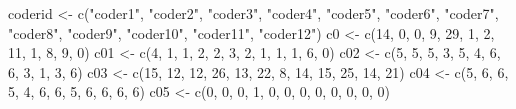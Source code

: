 \documentclass[
]{book}
\newenvironment{Shaded}{\begin{snugshade}}{\end{snugshade}}
\newcommand{\DecValTok}[1]{\textcolor[rgb]{0.00,0.00,0.81}{#1}}
\newcommand{\FunctionTok}[1]{\textcolor[rgb]{0.00,0.00,0.00}{#1}}
\newcommand{\NormalTok}[1]{#1}
\newcommand{\OtherTok}[1]{\textcolor[rgb]{0.56,0.35,0.01}{#1}}
\newcommand{\StringTok}[1]{\textcolor[rgb]{0.31,0.60,0.02}{#1}}
\begin{document}
\begin{Shaded}
\begin{Highlighting}[]
\NormalTok{coderid }\OtherTok{\textless{}{-}} \FunctionTok{c}\NormalTok{(}\StringTok{"coder1"}\NormalTok{, }\StringTok{"coder2"}\NormalTok{, }\StringTok{"coder3"}\NormalTok{, }\StringTok{"coder4"}\NormalTok{, }\StringTok{"coder5"}\NormalTok{, }
    \StringTok{"coder6"}\NormalTok{, }\StringTok{"coder7"}\NormalTok{, }\StringTok{"coder8"}\NormalTok{, }\StringTok{"coder9"}\NormalTok{, }\StringTok{"coder10"}\NormalTok{, }\StringTok{"coder11"}\NormalTok{, }
    \StringTok{"coder12"}\NormalTok{)}
\NormalTok{c0 }\OtherTok{\textless{}{-}} \FunctionTok{c}\NormalTok{(}\DecValTok{14}\NormalTok{, }\DecValTok{0}\NormalTok{, }\DecValTok{0}\NormalTok{, }\DecValTok{9}\NormalTok{, }\DecValTok{29}\NormalTok{, }\DecValTok{1}\NormalTok{, }\DecValTok{2}\NormalTok{, }\DecValTok{11}\NormalTok{, }\DecValTok{1}\NormalTok{, }\DecValTok{8}\NormalTok{, }\DecValTok{9}\NormalTok{, }\DecValTok{0}\NormalTok{)}
\NormalTok{c01 }\OtherTok{\textless{}{-}} \FunctionTok{c}\NormalTok{(}\DecValTok{4}\NormalTok{, }\DecValTok{1}\NormalTok{, }\DecValTok{1}\NormalTok{, }\DecValTok{2}\NormalTok{, }\DecValTok{2}\NormalTok{, }\DecValTok{3}\NormalTok{, }\DecValTok{2}\NormalTok{, }\DecValTok{1}\NormalTok{, }\DecValTok{1}\NormalTok{, }\DecValTok{1}\NormalTok{, }\DecValTok{6}\NormalTok{, }\DecValTok{0}\NormalTok{)}
\NormalTok{c02 }\OtherTok{\textless{}{-}} \FunctionTok{c}\NormalTok{(}\DecValTok{5}\NormalTok{, }\DecValTok{5}\NormalTok{, }\DecValTok{5}\NormalTok{, }\DecValTok{3}\NormalTok{, }\DecValTok{5}\NormalTok{, }\DecValTok{4}\NormalTok{, }\DecValTok{6}\NormalTok{, }\DecValTok{6}\NormalTok{, }\DecValTok{3}\NormalTok{, }\DecValTok{1}\NormalTok{, }\DecValTok{3}\NormalTok{, }\DecValTok{6}\NormalTok{)}
\NormalTok{c03 }\OtherTok{\textless{}{-}} \FunctionTok{c}\NormalTok{(}\DecValTok{15}\NormalTok{, }\DecValTok{12}\NormalTok{, }\DecValTok{12}\NormalTok{, }\DecValTok{26}\NormalTok{, }\DecValTok{13}\NormalTok{, }\DecValTok{22}\NormalTok{, }\DecValTok{8}\NormalTok{, }\DecValTok{14}\NormalTok{, }\DecValTok{15}\NormalTok{, }\DecValTok{25}\NormalTok{, }\DecValTok{14}\NormalTok{, }\DecValTok{21}\NormalTok{)}
\NormalTok{c04 }\OtherTok{\textless{}{-}} \FunctionTok{c}\NormalTok{(}\DecValTok{5}\NormalTok{, }\DecValTok{6}\NormalTok{, }\DecValTok{6}\NormalTok{, }\DecValTok{5}\NormalTok{, }\DecValTok{4}\NormalTok{, }\DecValTok{6}\NormalTok{, }\DecValTok{6}\NormalTok{, }\DecValTok{5}\NormalTok{, }\DecValTok{6}\NormalTok{, }\DecValTok{6}\NormalTok{, }\DecValTok{6}\NormalTok{, }\DecValTok{6}\NormalTok{)}
\NormalTok{c05 }\OtherTok{\textless{}{-}} \FunctionTok{c}\NormalTok{(}\DecValTok{0}\NormalTok{, }\DecValTok{0}\NormalTok{, }\DecValTok{0}\NormalTok{, }\DecValTok{1}\NormalTok{, }\DecValTok{0}\NormalTok{, }\DecValTok{0}\NormalTok{, }\DecValTok{0}\NormalTok{, }\DecValTok{0}\NormalTok{, }\DecValTok{0}\NormalTok{, }\DecValTok{0}\NormalTok{, }\DecValTok{0}\NormalTok{, }\DecValTok{0}\NormalTok{)}

\end{Highlighting}
\end{Shaded}
\end{document}
